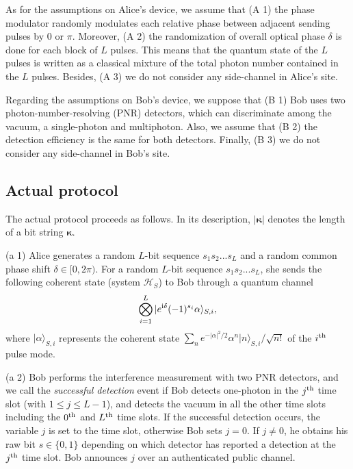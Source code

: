 \documentclass[prl,twocolumn,superscriptaddress,nofootinbib]{revtex4}
\def\U#1{{\rm #1}}
\newcommand{\ket}[1]{| #1 \rangle}
\begin{document}
As for the assumptions on Alice's device,
we assume that (A 1) the phase modulator randomly modulates each relative phase between adjacent sending pulses by 0 or $\pi$.
Moreover, (A 2) the randomization of 
overall optical phase $\delta$ is done for each block of $L$ pulses. This means that the quantum 
state of the $L$ pulses is written as a classical mixture of the total photon number contained in the $L$ pulses. 
Besides, (A 3) we do not consider any side-channel in Alice's site. 

Regarding the assumptions on Bob's device,
we suppose that (B 1) Bob uses two photon-number-resolving (PNR) detectors, which can discriminate among the vacuum,
a single-photon and multiphoton. Also, we assume that (B 2) the detection efficiency is the same for both detectors. 
Finally, (B 3) we do not consider any side-channel in Bob's site. 

\subsection{Actual protocol}
\label{sec:protocol}
The actual protocol proceeds as follows.
In its description, $|\bm{\kappa}|$ denotes the length of a bit string $\bm{\kappa}$. 

(a 1) Alice generates a random $L$-bit sequence $s_1s_2...s_L$ and a random common phase shift $\delta\in[0,2\pi)$.
  For a random $L$-bit sequence $s_1s_2...s_L$, she sends the following coherent state (system $\mathcal{H}_S$)
  to Bob through a quantum channel
  \begin{align}
    \bigotimes^L_{i=1}\ket{e^{\U{i}\delta}(-1)^{s_i}\alpha}_{S,i},
\label{sendingstate}
    \end{align}
  where $\ket{\alpha}_{S,i}$
  represents the coherent state $\sum_ne^{-|\alpha|^2/2}\alpha^n\ket{n}_{S,i}/\sqrt{n!}$ of the $i^{\U{th}}$ pulse mode. 
  
  (a 2) Bob performs the interference measurement with two PNR detectors,
  and we call the {\it successful detection} event 
  if Bob detects one-photon in the $j^{\U{th}}$ time slot (with $1\leq j\leq L-1$), and detects the vacuum in all the other time slots
  including the $0^{\U{th}}$ and $L^{\U{th}}$ time slots. 
  If the successful detection occurs, the variable $j$ is set to the time slot, otherwise Bob sets $j=0$.
  If $j\neq0$, he obtains his raw bit $s\in\{0,1\}$ depending on which detector has reported a 
  detection at the $j^{\U{th}}$ time slot. Bob announces $j$ over an authenticated public channel.
\end{document}
